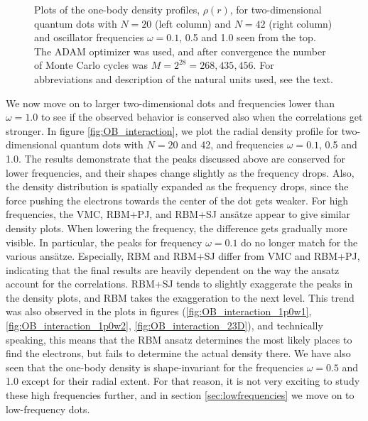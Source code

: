 \begin{figure}
	\caption{Plots of the one-body density profiles, $\rho(r)$, for two-dimensional quantum dots with $N=20$ (left column) and $N=42$ (right column) and oscillator frequencies $\omega=0.1$, 0.5 and 1.0 seen from the top. The ADAM optimizer was used, and after convergence the number of Monte Carlo cycles was $M=2^{28}=268,435,456$. For  abbreviations and description of the natural units used, see the text.}
	\label{fig:OB_interaction}
\end{figure}

We now move on to larger two-dimensional dots and frequencies lower than $\omega=1.0$ to see if the observed behavior is conserved also when the correlations get stronger. In figure \eqref{fig:OB_interaction}, we plot the radial density profile for two-dimensional quantum dots with $N=20$ and 42, and frequencies $\omega=0.1$, 0.5 and 1.0. The results demonstrate that the peaks discussed above are conserved for lower frequencies, and their shapes change slightly as the frequency drops. Also, the density distribution is spatially expanded as the frequency drops, since the force pushing the electrons towards the center of the dot gets weaker. For high frequencies, the VMC, RBM+PJ, and RBM+SJ ansätze appear to give similar density plots. When lowering the frequency, the difference gets gradually more visible. In particular, the peaks for frequency $\omega=0.1$ do no longer match for the various ansätze. Especially, RBM and RBM+SJ differ from VMC and RBM+PJ, indicating that the final results are heavily dependent on the way the ansatz account for the correlations. RBM+SJ tends to slightly exaggerate the peaks in the density plots, and RBM takes the exaggeration to the next level. This trend was also observed in the plots in figures (\ref{fig:OB_interaction_1p0w1}, \ref{fig:OB_interaction_1p0w2}, \ref{fig:OB_interaction_23D}), and technically speaking, this means that the RBM ansatz determines the most likely places to find the electrons, but fails to determine the actual density there. We have also seen that the one-body density is shape-invariant for the frequencies $\omega=0.5$ and 1.0 except for their radial extent. For that reason, it is not very exciting to study these high frequencies further, and in section \ref{sec:lowfrequencies} we move on to low-frequency dots.

